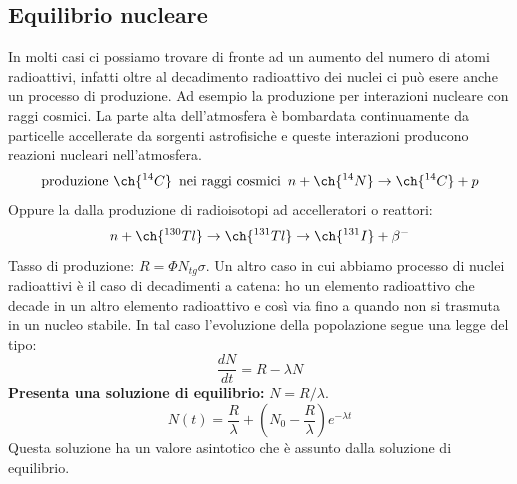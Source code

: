 \subsection{Equilibrio nucleare}
In molti casi ci possiamo trovare di fronte ad un aumento del numero di atomi radioattivi, infatti oltre al decadimento radioattivo dei nuclei ci può esere anche un processo di produzione. Ad esempio la produzione per interazioni nucleare con raggi cosmici. La parte alta dell'atmosfera è bombardata continuamente da particelle accellerate da sorgenti astrofisiche e queste interazioni producono reazioni nucleari nell'atmosfera. 
\begin{equation*}
    \text{produzione }\ch{^{14}C}\, \text{ nei raggi cosmici }\, n+\ch{^{14}N}\to\ch{^{14}C}+p
\end{equation*}
Oppure la dalla produzione di radioisotopi ad accelleratori o reattori:
\begin{equation*}
    n+\ch{^{130}Tl}\to\ch{^{131}Tl}\to\ch{^{131}I}+\beta^{-}
\end{equation*}
Tasso di produzione: $R=\Phi N_{tg}\sigma$. Un altro caso in cui abbiamo processo di nuclei radioattivi è il caso di decadimenti a catena: ho un elemento radioattivo che decade in un altro elemento radioattivo e così via fino a quando non si trasmuta in un nucleo stabile. In tal caso l'evoluzione della popolazione segue una legge del tipo:
\begin{equation*}
    \frac{dN}{dt}=R-\lambda N
\end{equation*}
\textbf{Presenta una soluzione di equilibrio:} $N=R/\lambda$.
\begin{equation*}
    N(t)=\frac{R}{\lambda}+(N_0-\frac{R}{\lambda})e^{-\lambda t}
\end{equation*}
Questa soluzione ha un valore asintotico che è assunto dalla soluzione di equilibrio.
